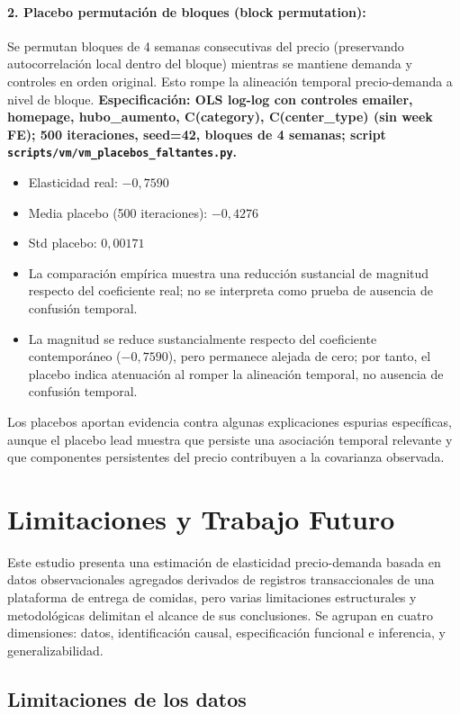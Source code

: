 \documentclass[doc, a4paper, biblatex, floatsintext, longtable, babel]{apa7}
\begin{document}
\paragraph{2. Placebo permutación de bloques (block permutation):} Se permutan bloques de 4 semanas consecutivas del precio (preservando autocorrelación local dentro del bloque) mientras se mantiene demanda y controles en orden original. Esto rompe la alineación temporal precio-demanda a nivel de bloque. \textbf{Especificación: OLS log-log con controles emailer, homepage, hubo\_aumento, C(category), C(center\_type) (sin week FE); 500 iteraciones, seed=42, bloques de 4 semanas; script \texttt{scripts/vm/vm\_placebos\_faltantes.py}.}
\begin{itemize}
    \item Elasticidad real: $-0,7590$
    \item Media placebo (500 iteraciones): $-0,4276$
    \item Std placebo: $0,00171$
    \item La comparación empírica muestra una reducción sustancial de magnitud respecto del coeficiente real; no se interpreta como prueba de ausencia de confusión temporal.
    \item La magnitud se reduce sustancialmente respecto del coeficiente contemporáneo ($-0,7590$), pero permanece alejada de cero; por tanto, el placebo indica atenuación al romper la alineación temporal, no ausencia de confusión temporal.
\end{itemize}

Los placebos aportan evidencia contra algunas explicaciones espurias específicas, aunque el placebo lead muestra que persiste una asociación temporal relevante y que componentes persistentes del precio contribuyen a la covarianza observada.

\section{Limitaciones y Trabajo Futuro}
\label{subsec:limitaciones}

Este estudio presenta una estimación de elasticidad precio-demanda basada en datos observacionales agregados derivados de registros transaccionales de una plataforma de entrega de comidas, pero varias limitaciones estructurales y metodológicas delimitan el alcance de sus conclusiones. Se agrupan en cuatro dimensiones: datos, identificación causal, especificación funcional e inferencia, y generalizabilidad.

\subsection*{Limitaciones de los datos}
\end{document}
